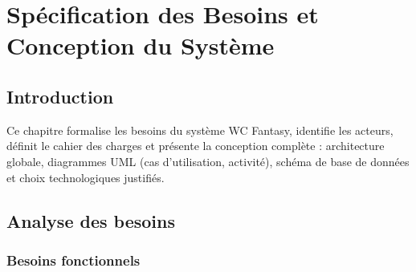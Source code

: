 
\chapter{Spécification des Besoins et Conception du Système}

\section*{Introduction}

Ce chapitre formalise les besoins du système WC Fantasy, identifie les acteurs, définit le cahier des charges et présente la conception complète : architecture globale, diagrammes UML (cas d'utilisation, activité), schéma de base de données et choix technologiques justifiés.

\section{Analyse des besoins}

\subsection{Besoins fonctionnels}

\vspace{0.3cm}

